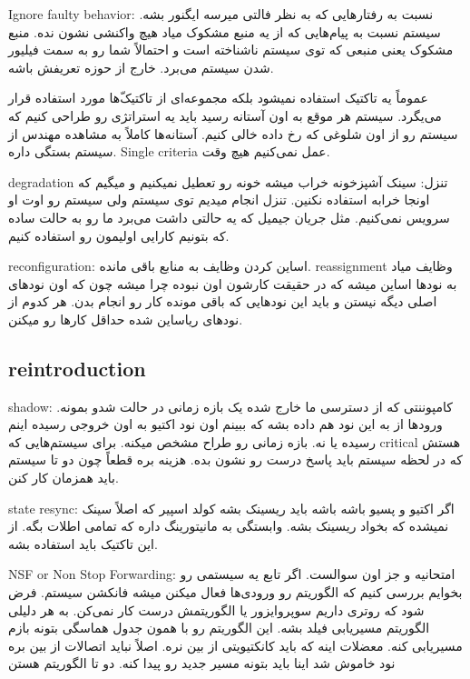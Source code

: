 Ignore faulty behavior: نسبت به رفتار‌هایی که به نظر فالتی میرسه ایگنور بشه.
سیستم نسبت به پیام‌هایی که از یه منبع مشکوک میاد هیچ واکنشی نشون نده. منبع مشکوک
یعنی منبعی که توی سیستم ناشناخته است و احتمالاً شما رو به سمت فیلیور شدن سیستم
می‌برد. خارج از حوزه تعریفش باشه.

عموماً یه تاکتیک استفاده نمیشود بلکه مجموعه‌ای از تاکتیک‌ّها مورد استفاده قرار
می‌یگرد. سیستم هر موقع به اون آستانه رسید باید یه استراتژی رو طراحی کنیم که
سیستم رو از اون شلوغی که رخ داده خالی کنیم. آستانه‌ها کاملاً به مشاهده مهندس از
سیستم بستگی داره. Single criteria عمل نمی‌کنیم هیچ وقت.

degradation تنزل:
سینک آشپزخونه خراب میشه خونه رو تعطیل نمیکنیم و میگیم که اونجا خرابه استفاده
نکنین. تنزل انجام میدیم توی سیستم ولی سیستم رو اوت او سرویس نمی‌کنیم. مثل جریان
جیمیل که یه حالتی داشت می‌برد ما رو به حالت ساده که بتونیم کارایی اولیمون رو
استفاده کنیم.

reconfiguration: اساین کردن وظایف به منابع باقی مانده. reassignment وظایف میاد
به نود‌ها اساین میشه که در حقیقت کارشون اون نبوده چرا میشه چون که اون نود‌های
اصلی دیگه نیستن و باید این نود‌هایی که باقی مونده کار رو انجام بدن. هر کدوم از
نود‌های ریاساین شده حداقل کار‌ها رو میکنن.

\subsection{reintroduction}

shadow: کامپوننتی که از دسترسی ما خارج شده یک بازه زمانی در حالت شدو بمونه.
ورود‌ها از به این نود هم داده بشه که ببینم اون نود اکتیو به اون خروجی رسیده اینم
رسیده یا نه. بازه زمانی رو طراح مشخص میکنه. برای سیستم‌هایی که critical هستش که
در لحظه سیستم باید پاسخ درست رو نشون بده. هزینه بره قطعاً چون دو تا سیستم باید
همزمان کار کنن.

state resync: اگر اکتیو و پسیو باشه باشه باید ریسینک بشه کولد اسپیر که اصلاً
سینک نمیشده که بخواد ریسینک بشه. وابستگی به مانیتورینگ داره که تمامی اطلات بگه.
از این تاکتیک باید استفاده بشه.

NSF or Non Stop Forwarding: امتحانیه و جز اون سوالست. اگر تابع یه سیستمی رو
بخوایم بررسی کنیم که الگوریتم رو ورودی‌ها فعال میکنن میشه فانکشن سیستم. فرض شود
که روتری داریم سوپروایزور یا الگوریتمش درست کار نمی‌کن. به هر دلیلی الگوریتم
مسیریابی فیلد بشه. این الگوریتم رو با همون جدول هماسگی بتونه بازم مسیریابی کنه.
معضلات اینه که باید کانکتیویتی از بین نره. اصلاً نباید اتصالات از بین بره نود
خاموش شد اینا باید بتونه مسیر جدید رو پیدا کنه. دو تا الگوریتم هستن 

